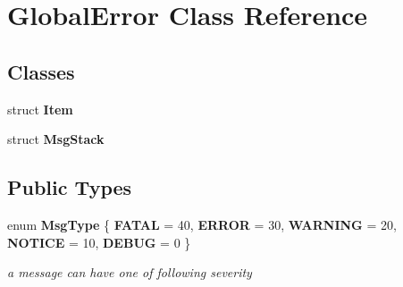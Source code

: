 \section{\-Global\-Error \-Class \-Reference}
\label{classGlobalError}
\subsection*{\-Classes}
\begin{DoxyCompactItemize}
\item 
struct {\bfseries \-Item}
\item 
struct {\bfseries \-Msg\-Stack}
\end{DoxyCompactItemize}
\subsection*{\-Public \-Types}
\begin{DoxyCompactItemize}
\item 
enum {\bf \-Msg\-Type} \{ \*
{\bf \-F\-A\-T\-A\-L} =  40, 
{\bf \-E\-R\-R\-O\-R} =  30, 
{\bf \-W\-A\-R\-N\-I\-N\-G} =  20, 
{\bf \-N\-O\-T\-I\-C\-E} =  10, 
\*
{\bf \-D\-E\-B\-U\-G} =  0
 \}
\begin{DoxyCompactList}\small\item\em a message can have one of following severity \end{DoxyCompactList}\end{DoxyCompactItemize}
